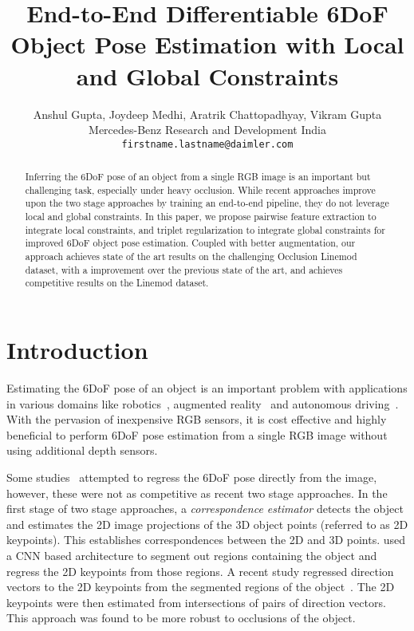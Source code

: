 \documentclass{article}
\title{End-to-End Differentiable 6DoF Object Pose Estimation with Local and Global Constraints}
\author{Anshul Gupta, Joydeep Medhi, Aratrik Chattopadhyay, Vikram Gupta \\
  Mercedes-Benz Research and Development India\\
\texttt{firstname.lastname@daimler.com}
}
\begin{document}
\maketitle

\begin{abstract}
Inferring the 6DoF pose of an object from a single RGB image is an important but challenging task, especially under heavy occlusion. While recent approaches improve upon the two stage approaches by training an end-to-end pipeline, they do not leverage local and global constraints. 
In this paper, we propose pairwise feature extraction to integrate local constraints, and triplet regularization to integrate global constraints for improved 6DoF object pose estimation.
Coupled with better augmentation, our approach achieves state of the art results on the challenging Occlusion Linemod dataset, with a  improvement over the previous state of the art, and achieves competitive results on the Linemod dataset.







\end{abstract}


\section{Introduction}

Estimating the 6DoF pose of an object is an important problem with applications in various domains like robotics~\cite{correll2016analysis}, augmented reality~\cite{arpose} and autonomous driving~\cite{song2019apollocar3d}. With the pervasion of inexpensive RGB sensors, it is cost effective and highly beneficial to perform 6DoF pose estimation from a single RGB image without using additional depth sensors.


Some studies~\cite{kehl2017ssd}\cite{xiang2018posecnn} attempted to regress the 6DoF pose directly from the image, however, these were not as competitive as recent two stage approaches. In the first stage of two stage approaches, a \textit{correspondence estimator} detects the object and estimates the 2D image projections of the 3D object points (referred to as 2D keypoints). This establishes correspondences between the 2D and 3D points. \cite{rad2017bb8}\cite{tekin2018real}\cite{hu2019segmentation} used a CNN based architecture to segment out regions containing the object and regress the 2D keypoints from those regions. A recent study regressed direction vectors to the 2D keypoints from the segmented regions of the object~\cite{peng2019pvnet}. The 2D keypoints were then estimated from intersections of pairs of direction vectors. This approach was found to be more robust to occlusions of the object. 
\end{document}
